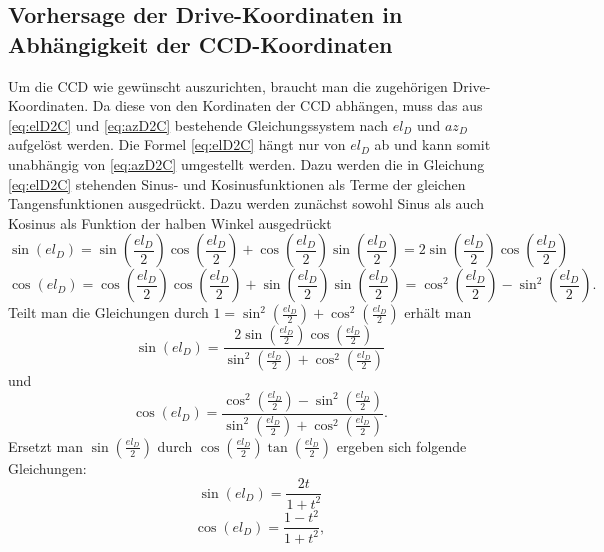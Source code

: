 \subsection{Vorhersage der Drive-Koordinaten in Abhängigkeit der CCD-Koordinaten}
Um die CCD wie gewünscht auszurichten, braucht man die zugehörigen Drive-Koordinaten. Da diese von den Kordinaten der CCD abhängen, muss das aus \ref{eq:elD2C} und \ref{eq:azD2C} bestehende Gleichungssystem nach $el_D$ und $az_D$ aufgelöst werden. Die Formel \ref{eq:elD2C} hängt nur von $el_D$ ab und kann somit unabhängig von \ref{eq:azD2C} umgestellt werden. Dazu werden die in Gleichung \ref{eq:elD2C} stehenden Sinus- und Kosinusfunktionen als Terme der gleichen Tangensfunktionen ausgedrückt. Dazu werden zunächst sowohl Sinus als auch Kosinus als Funktion der halben Winkel ausgedrückt
\begin{equation}
\sin\left( el_D \right) = \sin\left( \frac{el_D}{2} \right)\cos\left( \frac{el_D}{2} \right)+\cos\left( \frac{el_D}{2} \right)\sin\left( \frac{el_D}{2} \right)=2\sin\left( \frac{el_D}{2} \right)\cos\left( \frac{el_D}{2} \right)
\end{equation}
\begin{equation}
\cos\left( el_D \right) = \cos\left( \frac{el_D}{2} \right)\cos\left( \frac{el_D}{2} \right)+\sin\left( \frac{el_D}{2} \right)\sin\left( \frac{el_D}{2} \right)=\cos^2\left( \frac{el_D}{2} \right)-\sin^2\left( \frac{el_D}{2} \right).
\end{equation}
Teilt man die Gleichungen durch $1=\sin^2\left( \frac{el_D}{2} \right)+\cos^2\left( \frac{el_D}{2} \right)$ erhält man
\begin{equation}
\sin\left( el_D \right)=\frac{2\sin\left( \frac{el_D}{2} \right)\cos\left( \frac{el_D}{2} \right)}{\sin^2\left( \frac{el_D}{2} \right)+\cos^2\left( \frac{el_D}{2} \right)}
\end{equation}
und
\begin{equation}
\cos\left( el_D \right)=\frac{\cos^2\left( \frac{el_D}{2} \right)-\sin^2\left( \frac{el_D}{2} \right)}{\sin^2\left( \frac{el_D}{2} \right)+\cos^2\left( \frac{el_D}{2} \right)}.
\end{equation}
Ersetzt man $\sin\left(\frac{el_D}{2}\right)$ durch $\cos\left(\frac{el_D}{2}\right)\tan\left(\frac{el_D}{2}\right)$ ergeben sich folgende Gleichungen:
\begin{equation}
\sin\left(el_D\right)=\frac{2t}{1+t^2}
\label{eq:sint}
\end{equation}
\begin{equation}
\cos\left(el_D\right)=\frac{1-t^2}{1+t^2},
\label{eq:cost}
\end{equation}
